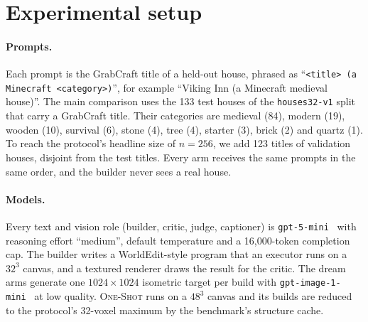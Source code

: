 \section{Experimental setup}
\label{sec:setup}

\paragraph{Prompts.}
Each prompt is the GrabCraft title of a held-out house, phrased as ``\texttt{<title> (a Minecraft <category>)}'', for example ``Viking Inn (a Minecraft medieval house)''. %
The main comparison uses the 133 test houses of the \texttt{houses32-v1} split that carry a GrabCraft title. %
Their categories are medieval (84), modern (19), wooden (10), survival (6), stone (4), tree (4), starter (3), brick (2) and quartz (1). %
To reach the protocol's headline size of $n{=}256$, we add 123 titles of validation houses, disjoint from the test titles. %
Every arm receives the same prompts in the same order, and the builder never sees a real house.

\paragraph{Models.}
Every text and vision role (builder, critic, judge, captioner) is \texttt{gpt-5-mini}~\citep{openai2025gpt5} with reasoning effort ``medium'', default temperature and a 16{,}000-token completion cap. %
The builder writes a WorldEdit-style program that an executor runs on a $32^3$ canvas, and a textured renderer draws the result for the critic. %
The dream arms generate one $1024{\times}1024$ isometric target per build with \texttt{gpt-image-1-mini}~\citep{openai2025gptimage} at low quality. %
\textsc{One-Shot} runs on a $48^3$ canvas and its builds are reduced to the protocol's 32-voxel maximum by the benchmark's structure cache. %

